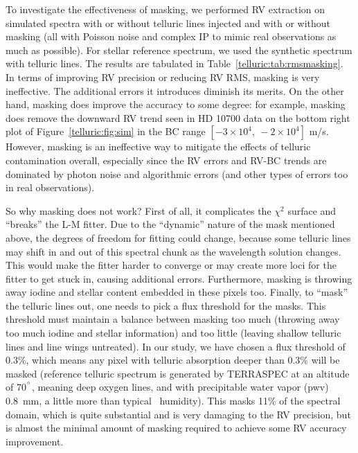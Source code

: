 To investigate the effectiveness of masking, we performed RV
extraction on simulated spectra with or without telluric lines
injected and with or without masking (all with Poisson noise and
complex IP to mimic real observations as much as possible). For
stellar reference spectrum, we used the synthetic spectrum with
telluric lines. The results are tabulated in
Table~\ref{telluric:tab:rmsmasking}. In terms of improving RV
precision or reducing RV RMS, masking is very ineffective. The
additional errors it introduces diminish its merits. On the other
hand, masking does improve the accuracy to some degree: for example,
masking does remove the downward RV trend seen in HD 10700 data on the
bottom right plot of Figure~\ref{telluric:fig:sim} in the BC range
$[-3\times10^4,\ -2\times10^4]$ m/s. However, masking is an
ineffective way to mitigate the effects of telluric contamination
overall, especially since the RV errors and RV-BC trends are dominated
by photon noise and algorithmic errors (and other types of errors too
in real observations).

So why masking does not work? First of all, it complicates the
$\chi^2$ surface and ``breaks'' the L-M fitter. Due to the ``dynamic''
nature of the mask mentioned above, the degrees of freedom for fitting
could change, because some telluric lines may shift in and out of this
spectral chunk as the wavelength solution changes. This would make the
fitter harder to converge or may create more loci for the fitter to
get stuck in, causing additional errors. Furthermore, masking is
throwing away iodine and stellar content embedded in these pixels
too. Finally, to ``mask'' the telluric lines out, one needs to pick a
flux threshold for the masks. This threshold must maintain a balance
between masking too much (throwing away too much iodine and stellar
information) and too little (leaving shallow telluric lines and line
wings untreated). In our study, we have chosen a flux threshold of
0.3\%, which means any pixel with telluric absorption deeper than
0.3\% will be masked (reference telluric spectrum is generated by
TERRASPEC at an altitude of 70$^{^{\circ}}$, meaning deep oxygen lines,
and with precipitable water vapor (pwv) 0.8~mm, a little more than
typical \keck\ humidity). This masks 11\% of the spectral domain,
which is quite substantial and is very damaging to the RV precision,
but is almost the minimal amount of masking required to achieve some
RV accuracy improvement.

